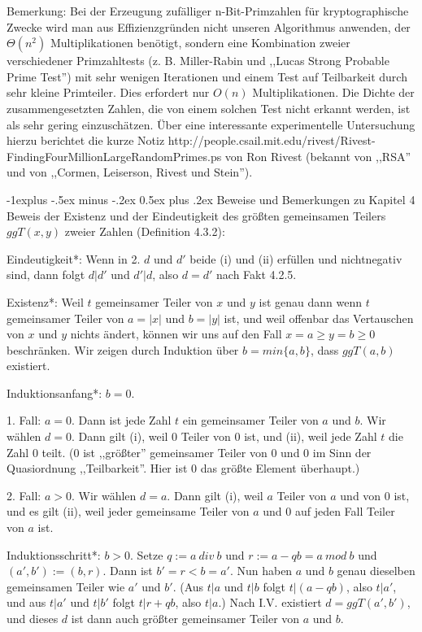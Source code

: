 \documentclass[a4paper]{article}
\makeatletter
\renewcommand{\subsection}{\@startsection{subsection}{2}{0mm}%
 {-1explus -.5ex minus -.2ex}%
 {0.5ex plus .2ex}%
 {\normalfont\normalsize\bfseries}}
\makeatother
\begin{document}
\begin{multicols}{3}
        Bemerkung: Bei der Erzeugung zufälliger n-Bit-Primzahlen für kryptographische Zwecke wird man aus Effizienzgründen nicht unseren Algorithmus anwenden, der $\Theta (n^2)$ Multiplikationen benötigt, sondern eine Kombination zweier verschiedener Primzahltests (z. B. Miller-Rabin und ,,Lucas Strong Probable Prime Test'') mit sehr wenigen Iterationen und einem Test auf Teilbarkeit durch sehr kleine Primteiler. Dies erfordert nur $O(n)$ Multiplikationen. Die Dichte der zusammengesetzten Zahlen, die von einem solchen Test nicht erkannt werden, ist als sehr gering einzuschätzen. Über eine interessante experimentelle Untersuchung hierzu berichtet die kurze Notiz http://people.csail.mit.edu/rivest/Rivest-FindingFourMillionLargeRandomPrimes.ps von Ron Rivest (bekannt von ,,RSA'' und von ,,Cormen, Leiserson, Rivest und Stein'').

        \subsection{Beweise und Bemerkungen zu Kapitel 4}
        Beweis der Existenz und der Eindeutigkeit des größten gemeinsamen Teilers $ggT(x,y)$ zweier Zahlen (Definition 4.3.2):
        \begin{itemize*}
            \item *Eindeutigkeit*: Wenn in 2. $d$ und $d'$ beide (i) und (ii) erfüllen und nichtnegativ sind, dann folgt $d|d'$ und $d'|d$, also $d=d'$ nach Fakt 4.2.5.
            \item *Existenz*: Weil $t$ gemeinsamer Teiler von $x$ und $y$ ist genau dann wenn $t$ gemeinsamer Teiler von $a=|x|$ und $b=|y|$ ist, und weil offenbar das Vertauschen von $x$ und $y$ nichts ändert, können wir uns auf den Fall $x=a\geq y=b\geq 0$ beschränken. Wir zeigen durch Induktion über $b=min\{a,b\}$, dass $ggT(a,b)$ existiert.
            \item *Induktionsanfang*: $b=0$.
            \item 1. Fall: $a= 0$. Dann ist jede Zahl $t$ ein gemeinsamer Teiler von $a$ und $b$. Wir wählen $d=0$. Dann gilt (i), weil $0$ Teiler von $0$ ist, und (ii), weil jede Zahl $t$ die Zahl $0$ teilt. ($0$ ist ,,größter'' gemeinsamer Teiler von 0 und 0 im Sinn der Quasiordnung ,,Teilbarkeit''. Hier ist 0 das größte Element überhaupt.)
            \item 2. Fall: $a >0$. Wir wählen $d=a$. Dann gilt (i), weil $a$ Teiler von $a$ und von 0 ist, und es gilt (ii), weil jeder gemeinsame Teiler von $a$ und 0 auf jeden Fall Teiler von $a$ ist.
            \item *Induktionsschritt*: $b>0$. Setze $q:=a\ div\ b$ und $r:=a-qb=a\ mod\ b$ und $(a',b'):=(b,r)$. Dann ist $b'=r < b=a'$. Nun haben $a$ und $b$ genau dieselben gemeinsamen Teiler wie $a'$ und $b'$. (Aus $t|a$ und $t|b$ folgt $t|(a-qb)$, also $t|a'$, und aus $t|a'$ und $t|b'$ folgt $t|r+qb$, also $t|a$.) Nach I.V. existiert $d= ggT(a',b')$, und dieses $d$ ist dann auch größter gemeinsamer Teiler von $a$ und $b$.
        \end{itemize*}



\end{multicols}
\end{document}
